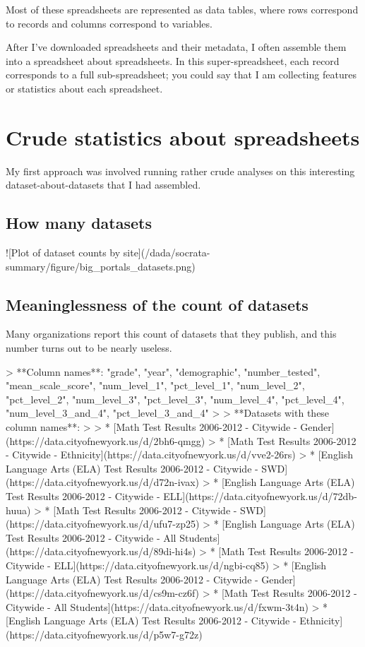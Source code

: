 \documentclass{acm_proc_article-sp}
\begin{document}
Most of these spreadsheets are represented as data tables,
where rows correspond to records and columns correspond to variables. \cite{table}

After I've downloaded spreadsheets and their metadata,
I often assemble them into a spreadsheet about spreadsheets. \cite{data-driven}
In this super-spreadsheet, each record corresponds to a full
sub-spreadsheet; you could say that I am collecting features or statistics
about each spreadsheet.

\section{Crude statistics about spreadsheets}
My first approach was involved running rather crude analyses on this
interesting dataset-about-datasets that I had assembled.

\subsection{How many datasets}
![Plot of dataset counts by site](/dada/socrata-summary/figure/big_portals_datasets.png)

\subsection{Meaninglessness of the count of datasets}

Many organizations report this count of datasets that they publish, and this number
turns out to be nearly useless.

> **Column names**: "grade", "year", "demographic", "number_tested", "mean_scale_score", "num_level_1", "pct_level_1", "num_level_2", "pct_level_2", "num_level_3", "pct_level_3", "num_level_4", "pct_level_4", "num_level_3_and_4", "pct_level_3_and_4"
>
> **Datasets with these column names**:
>
> * [Math Test Results 2006-2012 - Citywide - Gender](https://data.cityofnewyork.us/d/2bh6-qmgg)
> * [Math Test Results 2006-2012 - Citywide - Ethnicity](https://data.cityofnewyork.us/d/vve2-26rs)
> * [English Language Arts (ELA) Test Results 2006-2012 - Citywide - SWD](https://data.cityofnewyork.us/d/d72n-ivax)
> * [English Language Arts (ELA) Test Results 2006-2012 - Citywide - ELL](https://data.cityofnewyork.us/d/72db-huua)
> * [Math Test Results 2006-2012 - Citywide - SWD](https://data.cityofnewyork.us/d/ufu7-zp25)
> * [English Language Arts (ELA) Test Results 2006-2012 - Citywide - All Students](https://data.cityofnewyork.us/d/89di-hi4s)
> * [Math Test Results 2006-2012 - Citywide - ELL](https://data.cityofnewyork.us/d/ngbi-cq85)
> * [English Language Arts (ELA) Test Results 2006-2012 - Citywide - Gender](https://data.cityofnewyork.us/d/cs9m-cz6f)
> * [Math Test Results 2006-2012 - Citywide - All Students](https://data.cityofnewyork.us/d/fxwm-3t4n)
> * [English Language Arts (ELA) Test Results 2006-2012 - Citywide - Ethnicity](https://data.cityofnewyork.us/d/p5w7-g72z)
\end{document}
